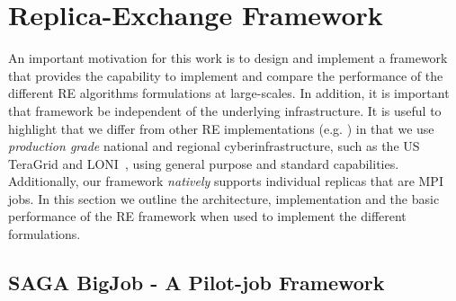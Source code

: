 \documentclass{rspublic}
\begin{document}
\section{Replica-Exchange Framework}\label{repexfw}

An important motivation for this work is to design and implement a
framework that provides the capability to implement and compare the
performance of the different RE algorithms formulations at
large-scales.  In addition, it is important that framework be
independent of the underlying infrastructure.  It is useful to
highlight that we differ from other RE implementations (e.g.
\cite{parashar_arepex}) in that we use {\it production grade}
national and regional cyberinfrastructure, such as the US TeraGrid and
LONI~\citep{LONI_web}, using general purpose and standard
capabilities.  Additionally, our framework {\it natively} supports
individual replicas that are MPI jobs. In this section we outline the
architecture, implementation and the basic performance of the RE
framework when used to implement the different formulations.



\subsection{SAGA BigJob - A Pilot-job Framework}
\label{sec:BigJob}

\end{document}
